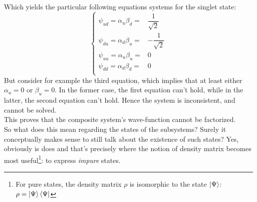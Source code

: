 \documentclass[solutions.tex]{subfiles}
\begin{document}
Which yields the particular following equations systems for the singlet state:
\[
	\begin{cases}
		\psi_{ud} = \alpha_u\beta_d =& \dfrac1{\sqrt2} \\
		\psi_{du} = \alpha_d\beta_u =& -\dfrac1{\sqrt2} \\
		\psi_{uu} = \alpha_u\beta_u =& 0 \\
		\psi_{dd} = \alpha_d\beta_d =& 0 \\
	\end{cases}
\]
But consider for example the third equation, which implies that
at least either $\alpha_u = 0$ or $\beta_u = 0$. In the former case,
the first equation can't hold, while in the latter, the second equation
can't hold. Hence the system is inconsistent, and cannot be solved. \\

This proves that the composite system's wave-function cannot be
factorized. \\

So what does this mean regarding the states of the subsystems? Surely
it conceptually makes sense to still talk about the existence of such
states? Yes, obviously is does and that's precisely where the notion
of density matrix becomes most useful\footnote{For pure states, the
density matrix $\rho$ is isomorphic to the state $|\Psi\rangle$:
$\rho = \left| \Psi \right\rangle\left\langle \Psi \right|$}: to express \textit{impure} states. \\
\end{document}
